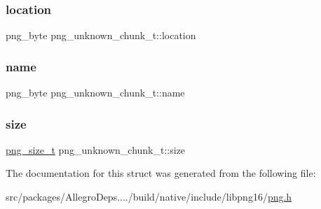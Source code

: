 \subsubsection{\texorpdfstring{location}{location}}
{\footnotesize\ttfamily png\+\_\+byte png\+\_\+unknown\+\_\+chunk\+\_\+t\+::location}

\mbox{\label{structpng__unknown__chunk__t_a8248a7c49234f9dc5fa3fa16a2d3d34c}} 
\subsubsection{\texorpdfstring{name}{name}}
{\footnotesize\ttfamily png\+\_\+byte png\+\_\+unknown\+\_\+chunk\+\_\+t\+::name}

\mbox{\label{structpng__unknown__chunk__t_a0a691245e0c04f01ecf767f215b6a652}} 
\subsubsection{\texorpdfstring{size}{size}}
{\footnotesize\ttfamily \hyperlink{libpng16_2pngconf_8h_a975e35d0a699ea3b08b8feef90fd29eb}{png\+\_\+size\+\_\+t} png\+\_\+unknown\+\_\+chunk\+\_\+t\+::size}



The documentation for this struct was generated from the following file\+:\begin{DoxyCompactItemize}
\item 
src/packages/\+Allegro\+Deps..../build/native/include/libpng16/\hyperlink{libpng16_2png_8h}{png.\+h}\end{DoxyCompactItemize}

